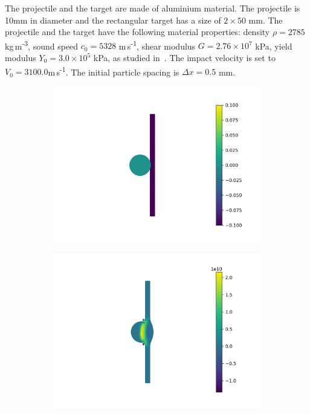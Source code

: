 \documentclass[preprint,12pt]{elsarticle}
\begin{document}
The projectile and the target are made of aluminium material. The projectile
is 10mm in diameter and the rectangular target has a size of $2 \times 50$ mm.
The projectile and the target have the following material properties: density
$\rho = 2785 $ kg\,m\textsuperscript{-3}, sound speed $c_0 = 5328$
 m\,s\textsuperscript{-1}, shear modulus $G=2.76 \times 10^{7}$ kPa, yield modulus
$Y_0 = 3.0 \times 10^{5}$ kPa, as studied in~\cite{zhang_hu_adams17}. The impact velocity is set to
$V_0 = 3100.0$m\,s\textsuperscript{-1}. The initial particle spacing is
$\Delta x = 0.5$ mm.
\begin{figure}[!htpb]
  \centering
  \begin{subfigure}{0.3\textwidth}
    \centering
    \includegraphics[width=1.0\textwidth]{figures/high_velocity_impact/etvf_sun2019/time0}
    \label{}
  \end{subfigure}
%
  \begin{subfigure}{0.3\textwidth}
    \centering
    \includegraphics[width=1.0\textwidth]{figures/high_velocity_impact/etvf_sun2019/time1}

\end{subfigure}
\end{figure}
\end{document}
